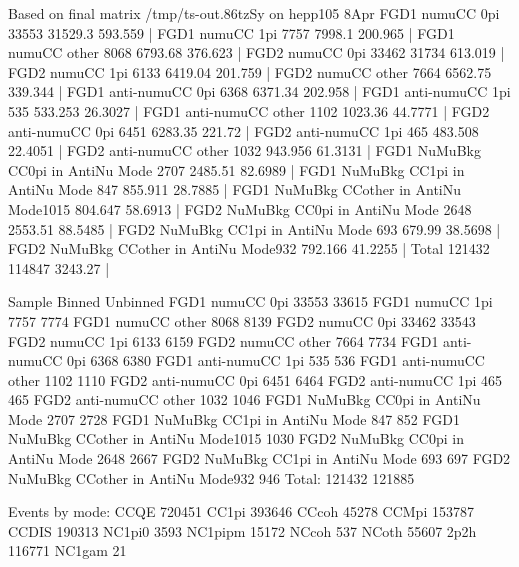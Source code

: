 Based on final matrix /tmp/ts-out.86tzSy on hepp105 8Apr
FGD1 numuCC 0pi                    33553     31529.3   593.559   |     
FGD1 numuCC 1pi                    7757      7998.1    200.965   |     
FGD1 numuCC other                  8068      6793.68   376.623   |     
FGD2 numuCC 0pi                    33462     31734     613.019   |     
FGD2 numuCC 1pi                    6133      6419.04   201.759   |     
FGD2 numuCC other                  7664      6562.75   339.344   |     
FGD1 anti-numuCC 0pi               6368      6371.34   202.958   |     
FGD1 anti-numuCC 1pi               535       533.253   26.3027   |     
FGD1 anti-numuCC other             1102      1023.36   44.7771   |     
FGD2 anti-numuCC 0pi               6451      6283.35   221.72    |     
FGD2 anti-numuCC 1pi               465       483.508   22.4051   |     
FGD2 anti-numuCC other             1032      943.956   61.3131   |     
FGD1 NuMuBkg CC0pi in AntiNu Mode  2707      2485.51   82.6989   |     
FGD1 NuMuBkg CC1pi in AntiNu Mode  847       855.911   28.7885   |     
FGD1 NuMuBkg CCother in AntiNu Mode1015      804.647   58.6913   |     
FGD2 NuMuBkg CC0pi in AntiNu Mode  2648      2553.51   88.5485   |     
FGD2 NuMuBkg CC1pi in AntiNu Mode  693       679.99    38.5698   |     
FGD2 NuMuBkg CCother in AntiNu Mode932       792.166   41.2255   |     
Total                              121432    114847    3243.27   | 

Sample                             Binned    Unbinned
FGD1 numuCC 0pi                    33553     33615
FGD1 numuCC 1pi                    7757      7774
FGD1 numuCC other                  8068      8139
FGD2 numuCC 0pi                    33462     33543
FGD2 numuCC 1pi                    6133      6159
FGD2 numuCC other                  7664      7734
FGD1 anti-numuCC 0pi               6368      6380
FGD1 anti-numuCC 1pi               535       536
FGD1 anti-numuCC other             1102      1110
FGD2 anti-numuCC 0pi               6451      6464
FGD2 anti-numuCC 1pi               465       465
FGD2 anti-numuCC other             1032      1046
FGD1 NuMuBkg CC0pi in AntiNu Mode  2707      2728
FGD1 NuMuBkg CC1pi in AntiNu Mode  847       852
FGD1 NuMuBkg CCother in AntiNu Mode1015      1030
FGD2 NuMuBkg CC0pi in AntiNu Mode  2648      2667
FGD2 NuMuBkg CC1pi in AntiNu Mode  693       697
FGD2 NuMuBkg CCother in AntiNu Mode932       946
Total:                             121432    121885

Events by mode:
CCQE                720451
CC1pi               393646
CCcoh               45278
CCMpi               153787
CCDIS               190313
NC1pi0              3593
NC1pipm             15172
NCcoh               537
NCoth               55607
2p2h                116771
NC1gam              21

